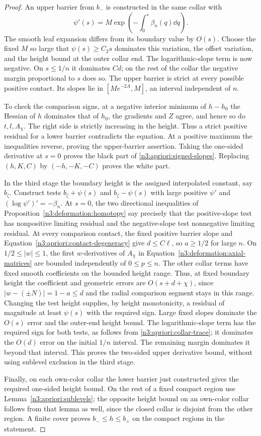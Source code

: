 \begin{proof}
An upper barrier from $b_-$ is constructed in the same collar with
\[
 \psi'(s)=M\exp\left(-\int_0^s\beta_n(q)\dd q\right).
\]
The smooth leaf expansion differs from its boundary value by $O(s)$.
Choose the fixed $M$ so large that
$\psi(s)\ge C_2s$ dominates this variation, the offset variation,
and the height bound at the outer collar end.  The logarithmic-slope
term is now negative.  On $s\le1/n$ it dominates $Cd$; on the rest
of the collar the negative margin proportional to $s$ does so.
The upper barrier is strict at every possible positive contact.
Its slopes lie in $[Me^{-2A},M]$, an interval independent of $n$.

To check the comparison signs, at a negative interior minimum of
$h-h_0$ the Hessian of $h$ dominates that of $h_0$, the gradients
and $Z$ agree, and hence so do $t,l,A_\chi$.  The right side is
strictly increasing in the height.  Thus a strict positive residual
for a lower barrier contradicts the equation.  At a positive maximum
the inequalities reverse, proving the upper-barrier assertion.
Taking the one-sided derivative at $s=0$ proves the black part of
\eqref{n3:apriori:signed-slopes}.  Replacing $(h,K,C)$ by
$(-h,-K,-C)$ proves the white part.

In the third stage the boundary height is the assigned interpolated
constant, say $b_\zeta$.  Construct tests
$b_\zeta+\psi(s)$ and $b_\zeta-\psi(s)$ with large positive
$\psi'$ and $(\log\psi')'=-\beta_n$.  At $s=0$, the two directional
inequalities of Proposition~\ref{n3:deformation:homotopy} say precisely
that the positive-slope test has nonpositive limiting residual and
the negative-slope test nonnegative limiting residual.  At every
comparison contact, the fixed positive barrier slope and
Equation~\eqref{n3:apriori:contact-degeneracy} give $d\le C\ell$, so
$a\ge1/2$ for large $n$.  On $1/2\le|w|\le1$, the first
$w$-derivatives of $A_\chi$ in
Equation~\eqref{n3:deformation:axial-matrices} are bounded independently
of $0\le p\le n$.  The other collar terms have fixed smooth
coefficients on the bounded height range.  Thus, at fixed boundary
height the coefficient and geometric errors are $O(s+d+\chi)$,
since $|w-(\pm N)|=1-a\le d$ and the radial comparison segment stays
in this range.  Changing the test height supplies, by height
monotonicity, a residual of magnitude at least $\psi(s)$ with the
required sign.  Large fixed slopes dominate the $O(s)$ error and
the outer-end height bound.  The logarithmic-slope term has the
required sign for both tests, as follows from
\eqref{n3:apriori:collar-trace}; it dominates the $O(d)$ error on the
initial $1/n$ interval.  The remaining margin dominates it beyond
that interval.  This proves the two-sided upper derivative bound,
without using sublevel exclusion in the third stage.

Finally, on each own-color collar the lower barrier just constructed
gives the required one-sided height bound.  On the rest of a fixed
compact region use Lemma~\ref{n3:apriori:sublevels}; the opposite height
bound on an own-color collar follows from that lemma as well, since
the closed collar is disjoint from the other region.  A finite cover
proves $b_-\le h\le b_+$ on the compact regions in the statement.
\end{proof}

